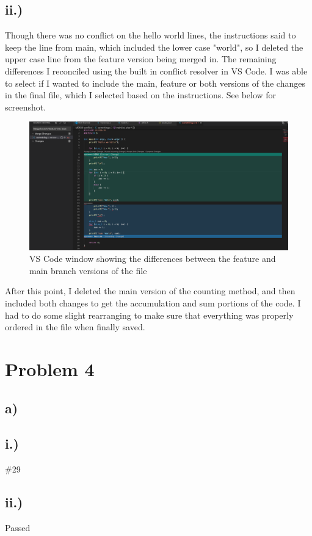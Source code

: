 \documentclass[11pt, oneside]{article}   	%
\begin{document}
	\subsection*{ii.)}
	Though there was no conflict on the hello world lines, the instructions said to keep the line from main, which included the lower case "world", so I deleted the upper case line from the feature version being merged in.
	\newline
The remaining differences I reconciled using the built in conflict resolver in VS Code.  I was able to select if I wanted to include the main, feature or both versions of the changes in the final file, which I selected based on the instructions.  See below for screenshot.
\newpage
		\begin{figure} [h]
			\centering
			\includegraphics[width=150 mm]{prob3ss.png}
			\caption{VS Code window showing the differences between the feature and main branch versions of the file}
		\end{figure}


After this point, I deleted the main version of the counting method, and then included both changes to get the accumulation and sum portions of the code.  I had to do some slight rearranging to make sure that everything was properly ordered in the file when finally saved.  
\section*{Problem 4}
\subsection*{a)}
\subsection*{i.)} \#29
\subsection*{ii.)}Passed
\end{document}
